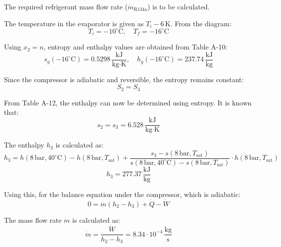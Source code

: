 The required refrigerant mass flow rate (\( \dot{m}_{\text{R134a}} \)) is to be calculated.  

The temperature in the evaporator is given as \( T_i - 6 \, \text{K} \).  
From the diagram:  
\[
T_i = -10^\circ\text{C}, \quad T_f = -16^\circ\text{C}
\]  

Using \( x_2 = n \), entropy and enthalpy values are obtained from Table A-10:  
\[
s_g(-16^\circ\text{C}) = 0.5298 \, \frac{\text{kJ}}{\text{kg·K}}, \quad h_g(-16^\circ\text{C}) = 237.74 \, \frac{\text{kJ}}{\text{kg}}
\]  

Since the compressor is adiabatic and reversible, the entropy remains constant:  
\[
S_2 = S_3
\]

From Table A-12, the enthalpy can now be determined using entropy. It is known that:  
\[
s_2 = s_3 = 6.528 \, \frac{\text{kJ}}{\text{kg·K}}
\]  

The enthalpy \( h_3 \) is calculated as:  
\[
h_3 = h(8 \, \text{bar}, 40^\circ\text{C}) - h(8 \, \text{bar}, T_{\text{sat}}) + \frac{s_3 - s(8 \, \text{bar}, T_{\text{sat}})}{s(8 \, \text{bar}, 40^\circ\text{C}) - s(8 \, \text{bar}, T_{\text{sat}})} \cdot h(8 \, \text{bar}, T_{\text{sat}})
\]  
\[
h_3 = 277.37 \, \frac{\text{kJ}}{\text{kg}}
\]  

Using this, for the balance equation under the compressor, which is adiabatic:  
\[
0 = \dot{m}(h_2 - h_3) + \dot{Q} - \dot{W}
\]  

The mass flow rate \( \dot{m} \) is calculated as:  
\[
\dot{m} = \frac{\dot{W}}{h_2 - h_3} = 8.34 \cdot 10^{-4} \, \frac{\text{kg}}{\text{s}}
\]